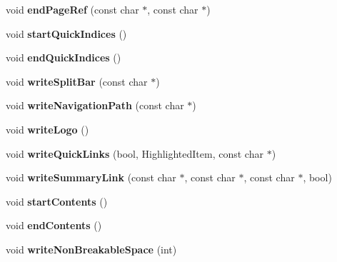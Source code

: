 \begin{DoxyCompactItemize}
void {\bfseries end\+Page\+Ref} (const char $\ast$, const char $\ast$)
\item 
\mbox{\label{class_latex_generator_a3fe16e2419736f6bdaffa0652997d0ef}} 
void {\bfseries start\+Quick\+Indices} ()
\item 
\mbox{\label{class_latex_generator_a8a107eb66c8340cc33fdfde6dac04861}} 
void {\bfseries end\+Quick\+Indices} ()
\item 
\mbox{\label{class_latex_generator_a03cf7304fa966648d6b43b16b9d71c47}} 
void {\bfseries write\+Split\+Bar} (const char $\ast$)
\item 
\mbox{\label{class_latex_generator_a166d8ecd50b8a231cf90896faf6ee337}} 
void {\bfseries write\+Navigation\+Path} (const char $\ast$)
\item 
\mbox{\label{class_latex_generator_a82e0611e3440955d89a6978936d22cec}} 
void {\bfseries write\+Logo} ()
\item 
\mbox{\label{class_latex_generator_acd7e692f462fed94bbe820d5bb4c82a0}} 
void {\bfseries write\+Quick\+Links} (bool, Highlighted\+Item, const char $\ast$)
\item 
\mbox{\label{class_latex_generator_a95e5d18bdec50446a0ba6f4b8c894ec3}} 
void {\bfseries write\+Summary\+Link} (const char $\ast$, const char $\ast$, const char $\ast$, bool)
\item 
\mbox{\label{class_latex_generator_a226b22a047a903fed1b3d30dad5e41ac}} 
void {\bfseries start\+Contents} ()
\item 
\mbox{\label{class_latex_generator_aac3b9ac454e3d4ba7d4de3bb9a1c4c6b}} 
void {\bfseries end\+Contents} ()
\item 
\mbox{\label{class_latex_generator_a5e671bec2d4436bc8dd7577ac925eaac}} 
void {\bfseries write\+Non\+Breakable\+Space} (int)
\item 
\mbox{\label{class_latex_generator_a6cedf5f253f92b21a660f5014988866a}} 

\end{DoxyCompactItemize}
